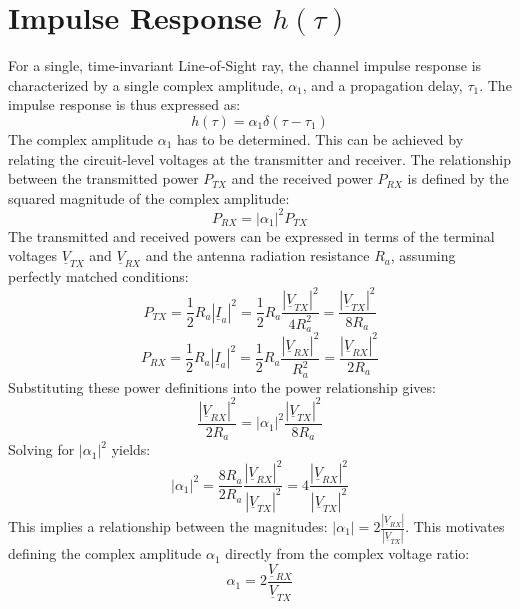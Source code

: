 \section{Impulse Response $h(\tau)$}
For a single, time-invariant Line-of-Sight ray, the channel impulse response is characterized by a single complex amplitude, $\alpha_1$, and a propagation delay, $\tau_1$. The impulse response is thus expressed as:
\begin{equation}
	h(\tau) = \alpha_1 \delta(\tau - \tau_1)
\end{equation}
The complex amplitude $\alpha_1$ has to be determined. This can be achieved by relating the circuit-level voltages at the transmitter and receiver. The relationship between the transmitted power $P_{TX}$ and the received power $P_{RX}$ is defined by the squared magnitude of the complex amplitude:
\begin{equation}
	P_{RX} = |\alpha_1|^2 P_{TX}
\end{equation}
The transmitted and received powers can be expressed in terms of the terminal voltages $\underline{V}_{TX}$ and $\underline{V}_{RX}$ and the antenna radiation resistance $R_a$, assuming perfectly matched conditions:
\begin{equation}
	P_{TX} = \frac{1}{2} R_a |\underline{I}_a|^2 = \frac{1}{2} R_a \frac{|\underline{V}_{TX}|^2}{4R_a^2} = \frac{|\underline{V}_{TX}|^2}{8R_a} 
\end{equation}
\begin{equation}
	P_{RX} = \frac{1}{2} R_a |\underline{I}_a|^2 = \frac{1}{2} R_a \frac{|\underline{V}_{RX}|^2}{R_a^2}= \frac{|\underline{V}_{RX}|^2}{2R_a}
\end{equation}
Substituting these power definitions into the power relationship gives:
\begin{equation}
	\frac{|\underline{V}_{RX}|^2}{2R_a} = |\alpha_1|^2 \frac{|\underline{V}_{TX}|^2}{8R_a}
\end{equation}
Solving for $|\alpha_1|^2$ yields:
\begin{equation}
	|\alpha_1|^2 = \frac{8R_a}{2R_a} \frac{|\underline{V}_{RX}|^2}{|\underline{V}_{TX}|^2} = 4 \frac{|\underline{V}_{RX}|^2}{|\underline{V}_{TX}|^2}
\end{equation}
This implies a relationship between the magnitudes: $|\alpha_1| = 2 \frac{|\underline{V}_{RX}|}{|\underline{V}_{TX}|}$. This motivates defining the complex amplitude $\alpha_1$ directly from the complex voltage ratio:
\begin{equation}
	\alpha_1 = 2 \frac{\underline{V}_{RX}}{\underline{V}_{TX}}
	\label{eq:alpha_from_voltages}
\end{equation}
